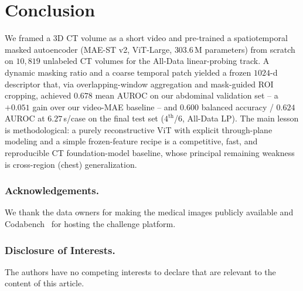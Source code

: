 \documentclass[runningheads]{llncs}
\begin{document}
\section{Conclusion}
We framed a 3D CT volume as a short video and pre-trained a spatiotemporal masked
autoencoder (MAE-ST v2, ViT-Large, $303.6$\,M parameters) from scratch on
$10{,}819$ unlabeled CT volumes for the All-Data linear-probing track. A dynamic
masking ratio and a coarse temporal patch yielded a frozen $1024$-d descriptor
that, via overlapping-window aggregation and mask-guided ROI cropping, achieved
$0.678$ mean AUROC on our abdominal validation set -- a $+0.051$ gain over our
video-MAE baseline -- and $0.600$ balanced accuracy / $0.624$ AUROC at
$6.27$\,s/case on the final test set ($4^{\text{th}}$/6, All-Data LP). The main
lesson is methodological: a purely reconstructive ViT with explicit
through-plane modeling and a simple frozen-feature recipe is a competitive,
fast, and reproducible CT foundation-model baseline, whose principal remaining
weakness is cross-region (chest) generalization.

\subsubsection{Acknowledgements.}
We thank the data owners for making the medical images publicly available and
Codabench~\cite{codabench} for hosting the challenge platform.

\subsubsection{Disclosure of Interests.}
The authors have no competing interests to declare that are relevant to the
content of this article.



\end{document}
